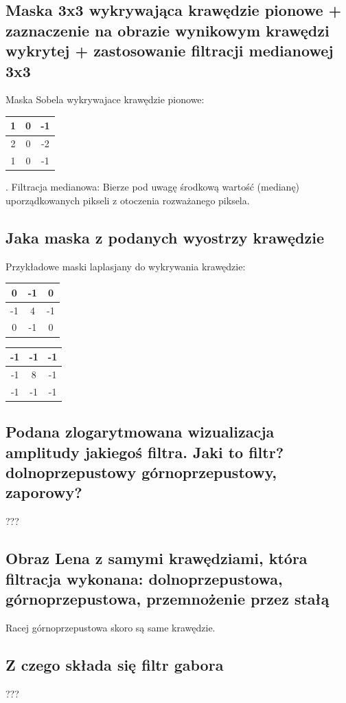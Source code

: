 \documentclass[a4paper, 12pt, titlepage]{article}
\begin{document}
\subsection{Maska 3x3 wykrywająca krawędzie pionowe + zaznaczenie na obrazie wynikowym krawędzi wykrytej + zastosowanie filtracji medianowej 3x3}
Maska Sobela wykrywajace krawędzie pionowe:
\begin{tabular}{|c|c|c|}
	\hline
	1 & 0 & -1 \\ \hline
	2 & 0 & -2 \\ \hline
	1 & 0 & -1 \\ \hline
\end{tabular}.
Filtracja medianowa: Bierze pod uwagę środkową wartość (medianę) uporządkowanych pikseli z otoczenia rozważanego piksela.

\subsection{Jaka maska z podanych wyostrzy krawędzie}
Przykładowe maski laplasjany do wykrywania krawędzie:
\begin{tabular}{|c|c|c|}
	\hline
	0 & -1 & 0 \\ \hline
	-1 & 4 & -1 \\ \hline
	0 & -1 & 0 \\ \hline
\end{tabular}
\begin{tabular}{|c|c|c|}
	\hline
	-1 & -1 & -1 \\ \hline
	-1 & 8 & -1 \\ \hline
	-1 & -1 & -1 \\ \hline
\end{tabular}

\subsection{Podana zlogarytmowana wizualizacja amplitudy jakiegoś filtra. Jaki to filtr? dolnoprzepustowy górnoprzepustowy, zaporowy?}
???

\subsection{Obraz Lena z samymi krawędziami, która filtracja wykonana: dolnoprzepustowa, górnoprzepustowa, przemnożenie przez stałą}
Racej górnoprzepustowa skoro są same krawędzie.

\subsection{Z czego składa się filtr gabora}
???
\end{document}
